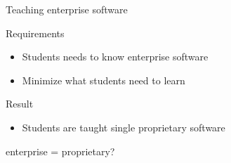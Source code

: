 \documentclass[xcolor={dvipsnames,usenames},beamer,aspectratio=169]{beamer}
\begin{document}
\newcommand{\coursesTitle}{North Carolina State University}


\begin{frame}{Teaching enterprise software}

\begin{block}{Requirements}
\begin{itemize}
 \item Students needs to know enterprise software
 \item Minimize what students need to learn
\end{itemize}
\end{block}

\begin{block}{Result}
\begin{itemize}
 \item Students are taught single proprietary software
\end{itemize}
\end{block}

\centering
\Large
enterprise = proprietary?

\end{frame}
\end{document}
